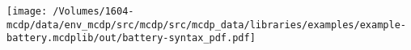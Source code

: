 
    \texttt{[image: /Volumes/1604-mcdp/data/env\_mcdp/src/mcdp/src/mcdp\_data/libraries/examples/example-battery.mcdplib/out/battery-syntax\_pdf.pdf]}
    